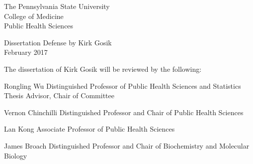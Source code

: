 \center
The Pennsylvania State University \\
College of Medicine \\
Public Health Sciences

Dissertation Defense by Kirk Gosik \\
February 2017


The dissertation of Kirk Gosik will be reviewed by the following:

Rongling Wu
Distinguished Professor of Public Health Sciences and Statistics
Thesis Advisor, Chair of Committee

Vernon Chinchilli
Distinguished Professor and Chair of Public Health Sciences


Lan Kong
Associate Professor of Public Health Sciences

James Broach
Distinguished Professor and Chair of Biochemistry and Molecular Biology
